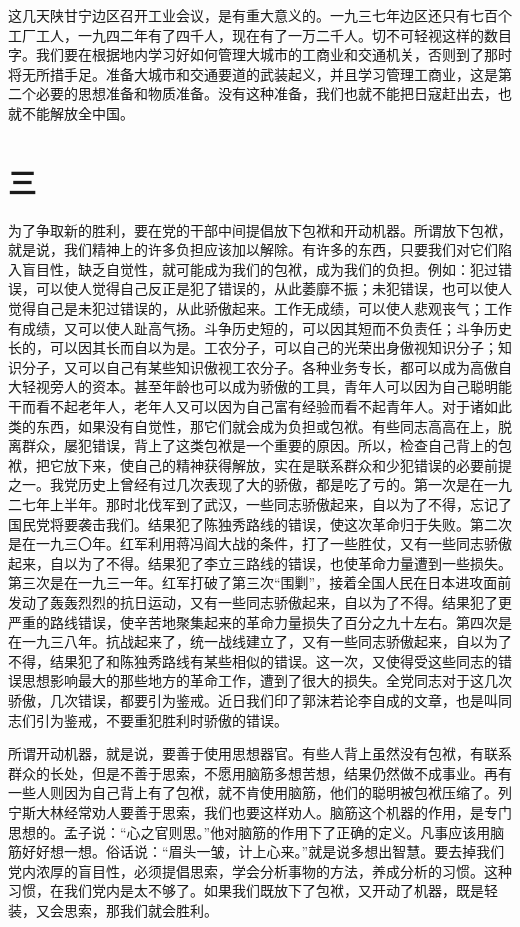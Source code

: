 这几天陕甘宁边区召开工业会议，是有重大意义的。一九三七年边区还只有七百个工厂工人，一九四二年有了四千人，现在有了一万二千人。切不可轻视这样的数目字。我们要在根据地内学习好如何管理大城市的工商业和交通机关，否则到了那时将无所措手足。准备大城市和交通要道的武装起义，并且学习管理工商业，这是第二个必要的思想准备和物质准备。没有这种准备，我们也就不能把日寇赶出去，也就不能解放全中国。

\section*{三}

为了争取新的胜利，要在党的干部中间提倡放下包袱和开动机器。所谓放下包袱，就是说，我们精神上的许多负担应该加以解除。有许多的东西，只要我们对它们陷入盲目性，缺乏自觉性，就可能成为我们的包袱，成为我们的负担。例如：犯过错误，可以使人觉得自己反正是犯了错误的，从此萎靡不振；未犯错误，也可以使人觉得自己是未犯过错误的，从此骄傲起来。工作无成绩，可以使人悲观丧气；工作有成绩，又可以使人趾高气扬。斗争历史短的，可以因其短而不负责任；斗争历史长的，可以因其长而自以为是。工农分子，可以自己的光荣出身傲视知识分子；知识分子，又可以自己有某些知识傲视工农分子。各种业务专长，都可以成为高傲自大轻视旁人的资本。甚至年龄也可以成为骄傲的工具，青年人可以因为自己聪明能干而看不起老年人，老年人又可以因为自己富有经验而看不起青年人。对于诸如此类的东西，如果没有自觉性，那它们就会成为负担或包袱。有些同志高高在上，脱离群众，屡犯错误，背上了这类包袱是一个重要的原因。所以，检查自己背上的包袱，把它放下来，使自己的精神获得解放，实在是联系群众和少犯错误的必要前提之一。我党历史上曾经有过几次表现了大的骄傲，都是吃了亏的。第一次是在一九二七年上半年。那时北伐军到了武汉，一些同志骄傲起来，自以为了不得，忘记了国民党将要袭击我们。结果犯了陈独秀路线的错误，使这次革命归于失败。第二次是在一九三〇年。红军利用蒋冯阎大战的条件，打了一些胜仗，又有一些同志骄傲起来，自以为了不得。结果犯了李立三路线的错误，也使革命力量遭到一些损失。第三次是在一九三一年。红军打破了第三次“围剿”，接着全国人民在日本进攻面前发动了轰轰烈烈的抗日运动，又有一些同志骄傲起来，自以为了不得。结果犯了更严重的路线错误，使辛苦地聚集起来的革命力量损失了百分之九十左右。第四次是在一九三八年。抗战起来了，统一战线建立了，又有一些同志骄傲起来，自以为了不得，结果犯了和陈独秀路线有某些相似的错误。这一次，又使得受这些同志的错误思想影响最大的那些地方的革命工作，遭到了很大的损失。全党同志对于这几次骄傲，几次错误，都要引为鉴戒。近日我们印了郭沫若论李自成的文章，也是叫同志们引为鉴戒，不要重犯胜利时骄傲的错误。

所谓开动机器，就是说，要善于使用思想器官。有些人背上虽然没有包袱，有联系群众的长处，但是不善于思索，不愿用脑筋多想苦想，结果仍然做不成事业。再有一些人则因为自己背上有了包袱，就不肯使用脑筋，他们的聪明被包袱压缩了。列宁斯大林经常劝人要善于思索，我们也要这样劝人。脑筋这个机器的作用，是专门思想的。孟子说：“心之官则思。”他对脑筋的作用下了正确的定义。凡事应该用脑筋好好想一想。俗话说：“眉头一皱，计上心来。”就是说多想出智慧。要去掉我们党内浓厚的盲目性，必须提倡思索，学会分析事物的方法，养成分析的习惯。这种习惯，在我们党内是太不够了。如果我们既放下了包袱，又开动了机器，既是轻装，又会思索，那我们就会胜利。


